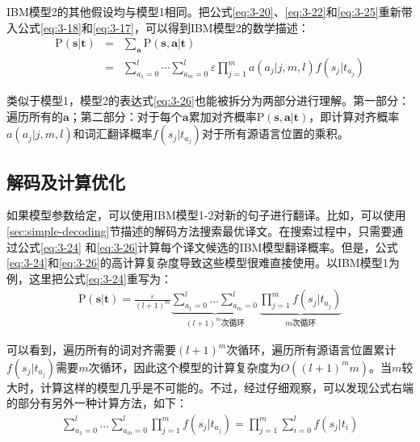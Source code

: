 \parinterval IBM模型2的其他假设均与模型1相同。把公式\ref{eq:3-20}、\ref{eq:3-22}和\ref{eq:3-25}重新带入公式\ref{eq:3-18}和\ref{eq:3-17}，可以得到IBM模型2的数学描述：
\begin{eqnarray}
\textrm{P}(\mathbf{s}| \mathbf{t}) & = &  \sum_{\mathbf{a}}{\textrm{P}(\mathbf{s},\mathbf{a}| \mathbf{t})} \nonumber \\
                       & = & \sum_{a_1=0}^{l}{\cdots}\sum _{a_m=0}^{l}{\varepsilon}\prod_{j=1}^{m}{a(a_j|j,m,l)f(s_j|t_{a_j})}
\label{eq:3-26}
\end{eqnarray}

\parinterval 类似于模型1，模型2的表达式\ref{eq:3-26}也能被拆分为两部分进行理解。第一部分：遍历所有的$\mathbf{a}$；第二部分：对于每个$\mathbf{a}$累加对齐概率$\textrm{P}(\mathbf{s},\mathbf{a}| \mathbf{t})$，即计算对齐概率$a(a_j|j,m,l)$和词汇翻译概率$f(s_j|t_{a_j})$对于所有源语言位置的乘积。


\subsection{解码及计算优化}

\parinterval 如果模型参数给定，可以使用IBM模型1-2对新的句子进行翻译。比如，可以使用\ref{sec:simple-decoding}节描述的解码方法搜索最优译文。在搜索过程中，只需要通过公式\ref{eq:3-24} 和\ref{eq:3-26}计算每个译文候选的IBM模型翻译概率。但是，公式\ref{eq:3-24}和\ref{eq:3-26}的高计算复杂度导致这些模型很难直接使用。以IBM模型1为例，这里把公式\ref{eq:3-24}重写为：
\begin{eqnarray}
\textrm{P}(\mathbf{s}| \mathbf{t}) = \frac{\varepsilon}{(l+1)^{m}} \underbrace{\sum\limits_{a_1=0}^{l} ... \sum\limits_{a_m=0}^{l}}_{(l+1)^m\textrm{次循环}} \underbrace{\prod\limits_{j=1}^{m} f(s_j|t_{a_j})}_{m\textrm{次循环}}
\label{eq:3-27}
\end{eqnarray}

\noindent 可以看到，遍历所有的词对齐需要$(l+1)^m$次循环，遍历所有源语言位置累计$f(s_j|t_{a_j})$需要$m$次循环，因此这个模型的计算复杂度为$O((l+1)^m m)$。当$m$较大时，计算这样的模型几乎是不可能的。不过，经过仔细观察，可以发现公式右端的部分有另外一种计算方法，如下：
\begin{eqnarray}
\sum\limits_{a_1=0}^{l} ... \sum\limits_{a_m=0}^{l} \prod\limits_{j=1}^{m} f(s_j|t_{a_j}) = \prod\limits_{j=1}^{m} \sum\limits_{i=0}^{l} f(s_j|t_i)
\label{eq:3-28}
\end{eqnarray}

